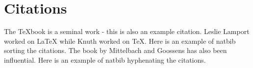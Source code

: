 \documentclass{article}
\begin{document}
\cleardoublepage

\section{Citations}
The TeXbook\cite{Knuth84} is a seminal work - this is also an example citation.  Leslie Lamport worked on LaTeX
while Knuth worked on TeX.  Here is an example of natbib sorting the citations\cite{Lamp86,Knuth84}.
The book by Mittelbach and Goossens\cite{Mitt04} has also been influential.
Here is an example of natbib hyphenating the citations\cite{Knuth84,Lamp86,Mitt04}.

\cleardoublepage



\end{document}
